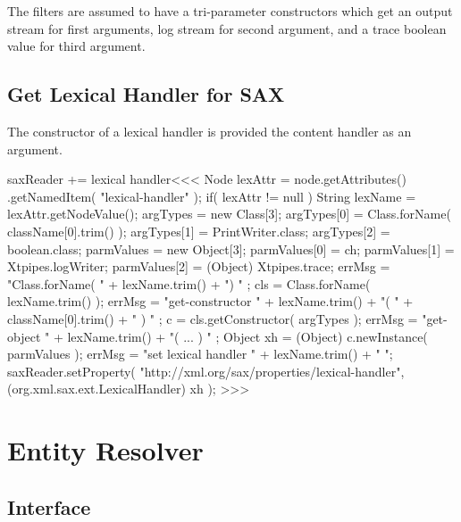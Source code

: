 \documentclass{article}
\begin{document}
The filters are assumed to have a tri-parameter constructors which
get an output stream for first arguments, log stream for second argument, and
a trace boolean value for third argument.



\subsection{Get Lexical Handler for SAX}









The constructor of a lexical handler is provided the
content handler as an argument.



\<saxReader += lexical handler\><<<
Node lexAttr = node.getAttributes()
                  .getNamedItem( "lexical-handler" );
if( lexAttr != null ){
   String lexName = lexAttr.getNodeValue();
   argTypes = new Class[3];
   argTypes[0] = Class.forName( className[0].trim() );
   argTypes[1] = PrintWriter.class;
   argTypes[2] = boolean.class;
   parmValues = new Object[3];
   parmValues[0] = ch;
   parmValues[1] = Xtpipes.logWriter;
   parmValues[2] = (Object) Xtpipes.trace;
   errMsg = "Class.forName( " + lexName.trim() + ") " ;
   cls = Class.forName( lexName.trim() );
   errMsg = "get-constructor " +
                lexName.trim() +
                "( " + className[0].trim() + " ) " ;
   c = cls.getConstructor( argTypes );
   errMsg = "get-object " +
               lexName.trim() + "( ... ) " ;
   Object xh = (Object) c.newInstance( parmValues );
   errMsg = "set lexical handler " + lexName.trim() + " ";
   saxReader.setProperty(
       "http://xml.org/sax/properties/lexical-handler",
       (org.xml.sax.ext.LexicalHandler) xh
    );
}
>>>










\section{Entity Resolver}


\subsection{Interface}
\end{document}
